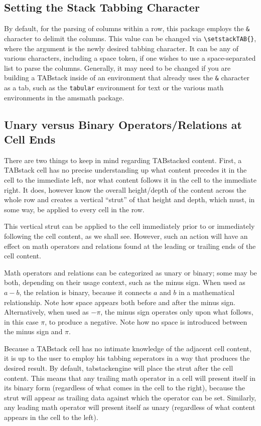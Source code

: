 \documentclass{article}
\begin{document}
\subsection*{Setting the Stack Tabbing Character}

By default, for the parsing of columns within a row, this package employs the \verb|&| character to delimit the
columns.  This value can be changed via \verb|\setstackTAB{}|, where the argument is the
newly desired tabbing character.  It can be any of various characters, including  a space token, 
if one wishes to use a space-separated
list to parse the columns.  Generally, it may need to be changed if you are building a TABstack
inside of an environment that already uses the \verb|&| character as a tab, such as the
\verb|tabular| environment for text or the various math environments in the \textsf{amsmath}
package.

\subsection*{Unary versus Binary Operators/Relations at Cell Ends}

There are two things to keep in mind regarding TABstacked content.  First, a TABstack cell has
no precise understanding up what content precedes it in the cell to the immediate left, nor what
content follows it in the cell to the immediate right.  It does, however know the overall height/depth
of the content across the whole row and creates a vertical ``strut'' of that height and depth, which must,
in some way,  be applied to every cell in the row.  

This vertical strut can be applied to the cell immediately
prior to or immediately following the cell content, as we shall see.  However, such an action will
have an effect on math operators and relations found at the leading or trailing ends of the cell
content.  

Math operators and relations can be categorized as unary or binary; some
may be both, depending on their usage context, such as the minus sign.  When used as $a-b$, the
relation is binary, because it connects $a$ and $b$ in a mathematical relationship.  Note how space
appears both before and after the minus sign.  Alternatively, when used as $-\pi$, the minus sign
operates only upon what follows, in this case $\pi$, to produce a negative.  Note how no space is
introduced between the minus sign and $\pi$.

Because a TABstack cell has no intimate knowledge of the adjacent cell content, it is up to
the user to employ his tabbing seperators in a way that produces the desired result.  By default,
\textsf{tabstackengine} will place the strut after the cell content.  This means that any trailing
math operator in a cell will present itself in its binary form (regardless of what comes in the
cell to the right), because the strut will appear as trailing data against which the operator can 
be set.  Similarly, any leading math operator will present itself as unary (regardless of what
content appears in the cell to the left).
\end{document}
